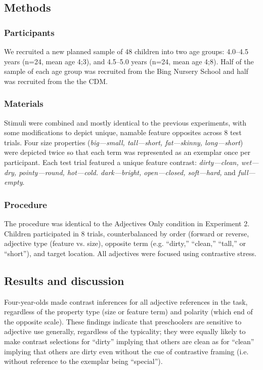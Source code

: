 \documentclass[man]{apa2}
\begin{document}
\subsection{Methods}

\subsubsection{Participants}

We recruited a new planned sample of 48 children into two age groups: 4.0--4.5 years (n=24, mean age 4;3), and 4.5--5.0 years (n=24, mean age 4;8).  Half of the sample of each age group was recruited from the Bing Nursery School and half was recruited from the the CDM.

\subsubsection{Materials}

Stimuli were combined and mostly identical to the previous experiments, with some modifications to depict unique, namable feature opposites across 8 test trials. Four size properties (\emph{big---small, tall---short, fat---skinny, long---short}) were depicted twice so that each term was represented as an exemplar once per participant.  Each test trial featured a unique feature contrast: \emph{dirty---clean, wet---dry, pointy---round, hot---cold. dark---bright, open---closed, soft---hard,} and \emph{full---empty}.  

\subsubsection{Procedure}

The procedure was identical to the Adjectives Only condition in Experiment 2. Children participated in 8 trials, counterbalanced by order (forward or reverse, adjective type (feature vs. size), opposite term (e.g. ``dirty,'' ``clean,'' ``tall,'' or ``short''), and target location. All adjectives were focused using contrastive stress. 

\subsection{Results and discussion}

Four-year-olds made contrast inferences for all adjective references in the task, regardless of the property type (size or feature term) and polarity (which end of the opposite scale). These findings indicate that preschoolers are sensitive to adjective use generally, regardless of the typicality; they were equally likely to make contrast selections for ``dirty'' implying that others are clean as for ``clean'' implying that others are dirty even without the cue of contrastive framing (i.e. without reference to the exemplar being ``special'').
\end{document}

